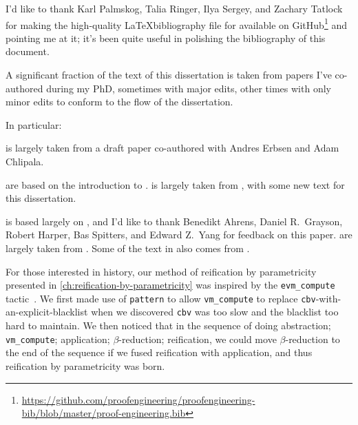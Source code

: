 I'd like to thank Karl Palmskog, Talia Ringer, Ilya Sergey, and Zachary Tatlock for making the high-quality \LaTeX\space bibliography file for  available on GitHub\footnote{\url{https://github.com/proofengineering/proofengineering-bib/blob/master/proof-engineering.bib}} and pointing me at it; it's been quite useful in polishing the bibliography of this document.

A significant fraction of the text of this dissertation is taken from papers I've co-authored during my PhD, sometimes with major edits, other times with only minor edits to conform to the flow of the dissertation.

In particular:

 is largely taken from a draft paper co-authored with Andres Erbsen and Adam Chlipala.

 are based on the introduction to .
 is largely taken from , with some new text for this dissertation.

 is based largely on , and I'd like to thank Benedikt Ahrens, Daniel R.~Grayson, Robert Harper, Bas Spitters, and Edward Z.~Yang for feedback on this paper.
 are largely taken from .
Some of the text in  also comes from .


For those interested in history, our method of reification by parametricity presented in \autoref{ch:reification-by-parametricity} was inspired by the \texttt{evm\_compute} tactic~\cite{MirrorShardITP14}.
We first made use of \texttt{pattern} to allow \texttt{vm\_compute} to replace \texttt{cbv}-with-an-explicit-blacklist when we discovered \texttt{cbv} was too slow and the blacklist too hard to maintain.
We then noticed that in the sequence of doing abstraction; \texttt{vm\_compute}; application; $\beta$-reduction; reification, we could move $\beta$-reduction to the end of the sequence if we fused reification with application, and thus reification by parametricity was born.

